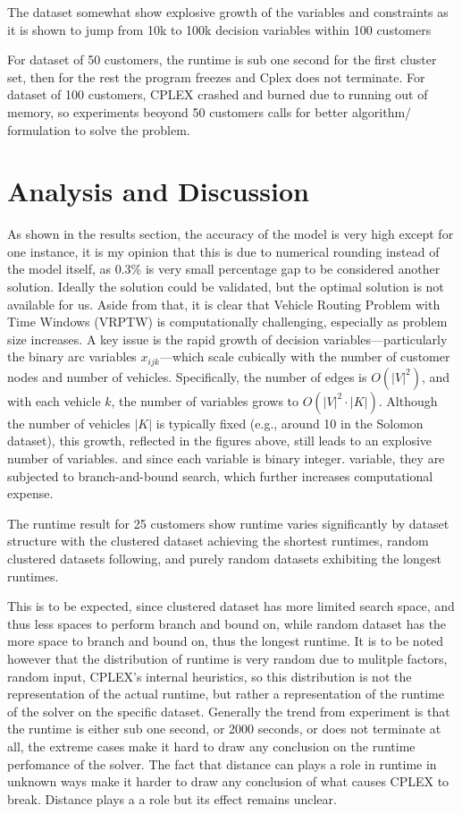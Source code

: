 \documentclass[twocolumn, 10pt]{article}
\begin{document}
The dataset somewhat show explosive growth of the variables and constraints as it is shown to jump from 10k to 100k decision variables within 100 customers

For dataset of 50 customers, the runtime is sub one second for the first cluster set, then for the rest the program freezes
and Cplex does not terminate.
For dataset of 100 customers, CPLEX crashed and burned due to running out of memory, so experiments beoyond 50
customers calls for better algorithm/ formulation to solve the problem.



\section*{Analysis and Discussion}
As shown in the results section, the accuracy of the model is very high except for one instance, it is my opinion that 
this is due to numerical rounding instead of the model itself, as 0.3\% is very small percentage gap to be considered another solution.
Ideally the solution could be validated, but the optimal solution is not available for us.
Aside from that, it is clear that
Vehicle Routing Problem with Time Windows (VRPTW) is computationally challenging, 
especially as problem size increases.
A key issue is the rapid growth of decision variables—particularly
the binary arc variables \( x_{ijk} \)—which scale cubically with the number of customer nodes and number of vehicles.
Specifically, the number of edges is \( O(|V|^2) \), and with each vehicle \( k \), 
the number of variables grows to \( O(|V|^2 \cdot |K|) \). 
Although the number of vehicles \( |K| \) is 
typically fixed (e.g., around 10 in the Solomon dataset), this growth, reflected in the figures above, still leads to an explosive number of variables.
and 
since each variable is binary integer. variable, they are subjected to branch-and-bound search, which further increases computational expense. 

The runtime result for 25 customers show 
runtime varies significantly by dataset structure with the clustered dataset achieving the shortest runtimes, random clustered datasets following, and purely random datasets exhibiting the longest runtimes.

This is to be expected, since clustered dataset has more limited search space, and thus less spaces to perform branch and bound on, while random dataset has the more space to branch and bound on, thus the longest runtime.
It is to be noted however that the distribution of runtime is very random due to mulitple factors,
random input, CPLEX's internal heuristics, so this distribution is not the representation of the actual runtime, 
but rather a representation of the runtime of the solver on the specific dataset. 
Generally the trend from experiment is 
that the runtime is either sub one second, or 2000 seconds, or does not terminate at all, the extreme cases
make it hard to draw any conclusion on the runtime perfomance of the solver. 
The fact that distance can plays a role in runtime in unknown ways make it harder to draw any conclusion of what causes 
CPLEX to break. Distance plays a a role but its effect remains unclear.
\end{document}

